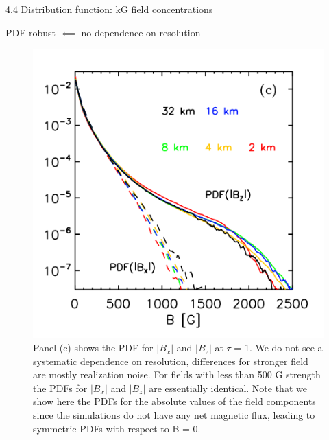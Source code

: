 \documentclass{beamer}
\begin{document}
\begin{frame}{}
4.4 Distribution function: kG field concentrations
\end{frame}

\begin{frame}{PDF  robust $\impliedby $ no dependence on resolution}

\begin{figure}[H]
 \centering
 \includegraphics[scale=0.3]{img44-1.png}
	\caption{
Panel (c) shows the PDF for $\lvert B_x \rvert$ and $\lvert B_z \rvert$ at $\tau$ = 1. We do
not see a systematic dependence on resolution, differences for
stronger field are mostly realization noise. For fields with less
than 500 G strength the PDFs for $\lvert B_x \rvert$ and $\lvert B_z \rvert$ are essentially
identical. Note that we show here the PDFs for the absolute values of the field components since the simulations do not have
any net magnetic flux, leading to symmetric PDFs with respect
to B = 0.}
\end{figure}




\end{frame}
\end{document}
